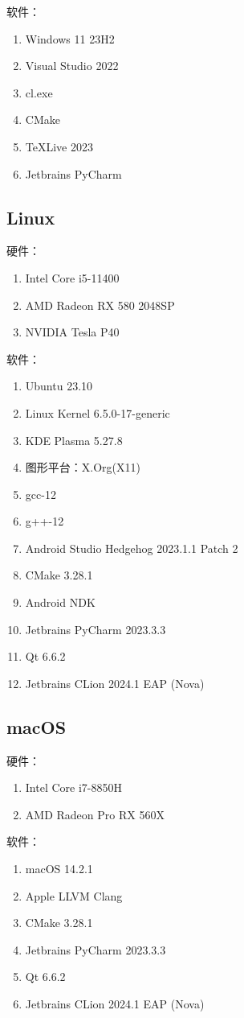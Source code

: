 软件：
\begin{enumerate}
	\item Windows 11 23H2
	\item Visual Studio 2022
	\item cl.exe
	\item CMake
	\item TeXLive 2023
	\item Jetbrains PyCharm
\end{enumerate}

\subsection{Linux}

硬件：
\begin{enumerate}
	\item Intel Core i5-11400
	\item AMD Radeon RX 580 2048SP
	\item NVIDIA Tesla P40
\end{enumerate}

软件：
\begin{enumerate}
	\item Ubuntu 23.10
	\item Linux Kernel 6.5.0-17-generic
	\item KDE Plasma 5.27.8
	\item 图形平台：X.Org(X11)
	\item gcc-12
	\item g++-12
	\item Android Studio Hedgehog 2023.1.1 Patch 2
	\item CMake 3.28.1
	\item Android NDK
	\item Jetbrains PyCharm 2023.3.3
	\item Qt 6.6.2
	\item Jetbrains CLion 2024.1 EAP (Nova)
\end{enumerate}

\subsection{macOS}

硬件：
\begin{enumerate}
	\item Intel Core i7-8850H
	\item AMD Radeon Pro RX 560X
\end{enumerate}

软件：
\begin{enumerate}
	\item macOS 14.2.1
	\item Apple LLVM Clang
	\item CMake 3.28.1
	\item Jetbrains PyCharm 2023.3.3
	\item Qt 6.6.2
	\item Jetbrains CLion 2024.1 EAP (Nova)
\end{enumerate}
